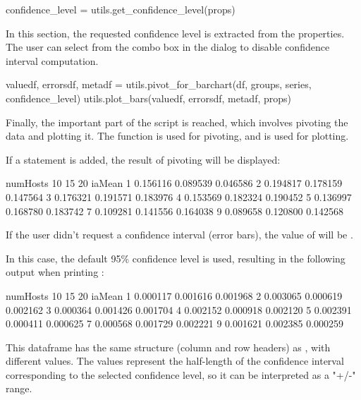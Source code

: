\begin{python}
confidence_level = utils.get_confidence_level(props)
\end{python}

In this section, the requested confidence level is extracted from the
properties. The user can select  from the combo box in the dialog to
disable confidence interval computation.

\begin{python}
valuedf, errorsdf, metadf =
    utils.pivot_for_barchart(df, groups, series, confidence_level)
utils.plot_bars(valuedf, errorsdf, metadf, props)
\end{python}

Finally, the important part of the script is reached, which involves pivoting
the data and plotting it. The function  is
used for pivoting, and  is used for plotting.

If a  statement is added, the result of pivoting will be displayed:

\begin{commandline}
numHosts        10        15        20
iaMean
1         0.156116  0.089539  0.046586
2         0.194817  0.178159  0.147564
3         0.176321  0.191571  0.183976
4         0.153569  0.182324  0.190452
5         0.136997  0.168780  0.183742
7         0.109281  0.141556  0.164038
9         0.089658  0.120800  0.142568
\end{commandline}

If the user didn't request a confidence interval (error bars), the value of
 will be .

In this case, the default 95\% confidence level is used, resulting in the
following output when printing :

\begin{commandline}
numHosts        10        15        20
iaMean
1         0.000117  0.001616  0.001968
2         0.003065  0.000619  0.002162
3         0.000364  0.001426  0.001704
4         0.002152  0.000918  0.002120
5         0.002391  0.000411  0.000625
7         0.000568  0.001729  0.002221
9         0.001621  0.002385  0.000259
\end{commandline}

This dataframe has the same structure (column and row headers) as ,
with different values. The values represent the half-length of the confidence
interval corresponding to the selected confidence level, so it can be
interpreted as a "+/-" range.

